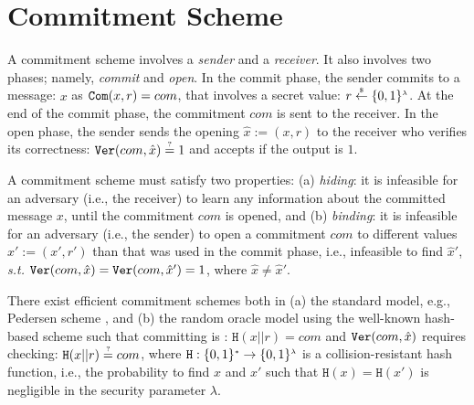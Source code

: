 



\section{Commitment Scheme}\label{subsec:commit}


 A commitment scheme involves a  \emph{sender} and a \emph{receiver}. It also  involves  two phases; namely, \emph{commit} and  \emph{open}. In the commit phase, the sender  commits to a message: $x$ as $\mathtt{Com}(x,r)=com$, that involves a secret value: $r\stackrel{\scriptscriptstyle\$}\leftarrow \{0,1\}^{\scriptscriptstyle\lambda}$. At the end of the commit phase,  the commitment ${com}$ is sent to the receiver. In the open phase, the sender sends the opening $\hat{x}:=(x, r)$ to the receiver who verifies its correctness: $\mathtt{Ver}({com},\hat{x})\stackrel{\scriptscriptstyle ?}=1$ and accepts if the output is $1$.  
 
 A commitment scheme must satisfy two properties: (a) \textit{hiding}: it is infeasible for an adversary (i.e., the receiver) to learn any information about the committed  message $x$, until the commitment ${com}$ is opened, and (b) \textit{binding}: it is infeasible for an adversary (i.e., the sender) to open a commitment ${com}$ to different values $\hat{x}':=(x',r')$ than that was  used in the commit phase, i.e., infeasible to find  $\hat{x}'$, \textit{s.t.} $\mathtt{Ver}({com},\hat{x})=\mathtt{Ver}({com},\hat{x}')=1$, where $\hat{x}\neq \hat{x}'$.  
 
 There exist efficient  commitment schemes both in (a) the standard model, e.g., Pedersen scheme \cite{Pedersen91}, and (b)  the random oracle model using the well-known hash-based scheme such that committing  is : $\mathtt{H}(x||r)={com}$ and $\mathtt{Ver}({com},\hat{x})$ requires checking: $\mathtt{H}(x||r)\stackrel{\scriptscriptstyle ?}={com}$, where $\mathtt{H}:\{0,1\}^{\scriptscriptstyle *}\rightarrow \{0,1\}^{\scriptscriptstyle\lambda}$ is a collision-resistant hash function, i.e., the probability to find $x$ and $x'$ such that $\mathtt{H}(x)=\mathtt{H}(x')$ is negligible in the security parameter $\lambda$.